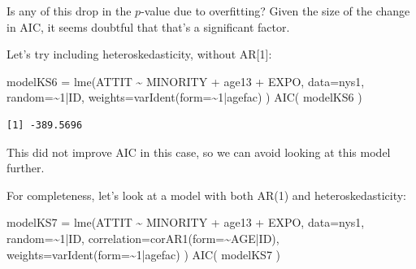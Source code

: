 \documentclass[
  letterpaper,
  DIV=11,
  numbers=noendperiod]{scrreprt}
\newenvironment{Shaded}{}{}
\newcommand{\AttributeTok}[1]{\textcolor[rgb]{0.49,0.56,0.16}{#1}}
\newcommand{\DecValTok}[1]{\textcolor[rgb]{0.25,0.63,0.44}{#1}}
\newcommand{\FunctionTok}[1]{\textcolor[rgb]{0.02,0.16,0.49}{#1}}
\newcommand{\NormalTok}[1]{#1}
\newcommand{\OtherTok}[1]{\textcolor[rgb]{0.00,0.44,0.13}{#1}}
\newcommand{\SpecialCharTok}[1]{\textcolor[rgb]{0.25,0.44,0.63}{#1}}
\begin{document}
Is any of this drop in the \(p\)-value due to overfitting? Given the
size of the change in AIC, it seems doubtful that that's a significant
factor.

Let's try including heteroskedasticity, without AR{[}1{]}:

\begin{Shaded}
\begin{Highlighting}[]
\NormalTok{modelKS6 }\OtherTok{=} \FunctionTok{lme}\NormalTok{(ATTIT }\SpecialCharTok{\textasciitilde{}}\NormalTok{ MINORITY }\SpecialCharTok{+}\NormalTok{ age13 }\SpecialCharTok{+}\NormalTok{ EXPO, }
              \AttributeTok{data=}\NormalTok{nys1,}
              \AttributeTok{random=}\SpecialCharTok{\textasciitilde{}}\DecValTok{1}\SpecialCharTok{|}\NormalTok{ID,}
              \AttributeTok{weights=}\FunctionTok{varIdent}\NormalTok{(}\AttributeTok{form=}\SpecialCharTok{\textasciitilde{}}\DecValTok{1}\SpecialCharTok{|}\NormalTok{agefac) )}
\FunctionTok{AIC}\NormalTok{( modelKS6 )}
\end{Highlighting}
\end{Shaded}

\begin{verbatim}
[1] -389.5696
\end{verbatim}

This did not improve AIC in this case, so we can avoid looking at this
model further.

For completeness, let's look at a model with both AR(1) and
heteroskedasticity:

\begin{Shaded}
\begin{Highlighting}[]
\NormalTok{modelKS7 }\OtherTok{=} \FunctionTok{lme}\NormalTok{(ATTIT }\SpecialCharTok{\textasciitilde{}}\NormalTok{ MINORITY }\SpecialCharTok{+}\NormalTok{ age13 }\SpecialCharTok{+}\NormalTok{ EXPO, }
              \AttributeTok{data=}\NormalTok{nys1,}
              \AttributeTok{random=}\SpecialCharTok{\textasciitilde{}}\DecValTok{1}\SpecialCharTok{|}\NormalTok{ID,}
              \AttributeTok{correlation=}\FunctionTok{corAR1}\NormalTok{(}\AttributeTok{form=}\SpecialCharTok{\textasciitilde{}}\NormalTok{AGE}\SpecialCharTok{|}\NormalTok{ID),}
              \AttributeTok{weights=}\FunctionTok{varIdent}\NormalTok{(}\AttributeTok{form=}\SpecialCharTok{\textasciitilde{}}\DecValTok{1}\SpecialCharTok{|}\NormalTok{agefac) )}
\FunctionTok{AIC}\NormalTok{( modelKS7 )}
\end{Highlighting}
\end{Shaded}
\end{document}
